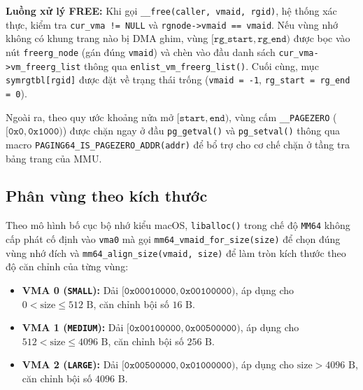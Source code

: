 \documentclass[12pt,a4paper]{article}
\begin{document}
    \noindent\textbf{Luồng xử lý FREE:}
    Khi gọi \texttt{\_\_free(caller, vmaid, rgid)}, hệ thống xác thực, kiểm tra \texttt{cur\_vma != NULL} và \texttt{rgnode->vmaid == vmaid}. Nếu vùng nhớ không có khung trang nào bị DMA ghim, vùng $[\texttt{rg\_start}, \texttt{rg\_end})$ được bọc vào nút \texttt{freerg\_node} (gán đúng \texttt{vmaid}) và chèn vào đầu danh sách \texttt{cur\_vma->vm\_freerg\_list} thông qua \texttt{enlist\_vm\_freerg\_list()}. Cuối cùng, mục \texttt{symrgtbl[rgid]} được đặt về trạng thái trống (\texttt{vmaid = -1}, \texttt{rg\_start = rg\_end = 0}).
    
    Ngoài ra, theo quy ước khoảng nửa mở $[\texttt{start}, \texttt{end})$, vùng cấm \texttt{\_\_PAGEZERO} ($[\texttt{0x0}, \texttt{0x1000})$) được chặn ngay ở đầu \texttt{pg\_getval()} và \texttt{pg\_setval()} thông qua macro \texttt{PAGING64\_IS\_PAGEZERO\_ADDR(addr)} để bổ trợ cho cơ chế chặn ở tầng tra bảng trang của MMU.
    
    \subsection{Phân vùng theo kích thước}
    
    Theo mô hình bố cục bộ nhớ kiểu macOS, \texttt{liballoc()} trong chế độ \texttt{MM64} không cấp phát cố định vào \texttt{vma0} mà gọi \texttt{mm64\_vmaid\_for\_size(size)} để chọn đúng vùng nhớ đích và \texttt{mm64\_align\_size(vmaid, size)} để làm tròn kích thước theo độ căn chỉnh của từng vùng:
    \begin{itemize}
        \item \textbf{VMA 0 (\texttt{SMALL}):} Dải $[\texttt{0x00010000}, \texttt{0x00100000})$, áp dụng cho $0 < \text{size} \le 512\text{ B}$, căn chỉnh bội số $16\text{ B}$.
        \item \textbf{VMA 1 (\texttt{MEDIUM}):} Dải $[\texttt{0x00100000}, \texttt{0x00500000})$, áp dụng cho $512 < \text{size} \le 4096\text{ B}$, căn chỉnh bội số $256\text{ B}$.
        \item \textbf{VMA 2 (\texttt{LARGE}):} Dải $[\texttt{0x00500000}, \texttt{0x01000000})$, áp dụng cho $\text{size} > 4096\text{ B}$, căn chỉnh bội số $4096\text{ B}$.
    \end{itemize}
\end{document}
